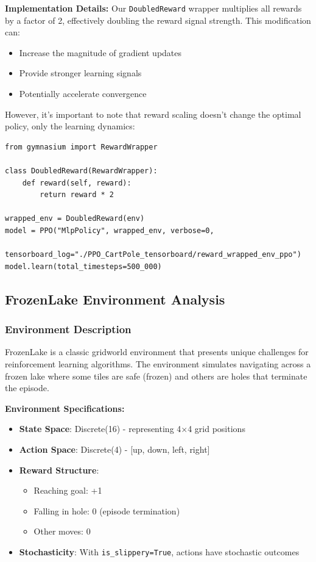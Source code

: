 \documentclass[12pt]{article}
\begin{document}
{{{\textbf{Implementation Details:}
Our \texttt{DoubledReward} wrapper multiplies all rewards by a factor of 2, effectively doubling the reward signal strength. This modification can:
\begin{itemize}
    \item Increase the magnitude of gradient updates
    \item Provide stronger learning signals
    \item Potentially accelerate convergence
\end{itemize}

However, it's important to note that reward scaling doesn't change the optimal policy, only the learning dynamics:

\begin{verbatim}
from gymnasium import RewardWrapper

class DoubledReward(RewardWrapper):
    def reward(self, reward):
        return reward * 2

wrapped_env = DoubledReward(env)
model = PPO("MlpPolicy", wrapped_env, verbose=0, 
           tensorboard_log="./PPO_CartPole_tensorboard/reward_wrapped_env_ppo")
model.learn(total_timesteps=500_000)
\end{verbatim}

\subsection{FrozenLake Environment Analysis}

\subsubsection{Environment Description}

FrozenLake is a classic gridworld environment that presents unique challenges for reinforcement learning algorithms. The environment simulates navigating across a frozen lake where some tiles are safe (frozen) and others are holes that terminate the episode.

\textbf{Environment Specifications:}
\begin{itemize}
    \item \textbf{State Space}: Discrete(16) - representing 4×4 grid positions
    \item \textbf{Action Space}: Discrete(4) - [up, down, left, right]
    \item \textbf{Reward Structure}: 
        \begin{itemize}
            \item Reaching goal: +1
            \item Falling in hole: 0 (episode termination)
            \item Other moves: 0
        \end{itemize}
    \item \textbf{Stochasticity}: With \texttt{is_slippery=True}, actions have stochastic outcomes
\end{itemize}

}}}
\end{document}

